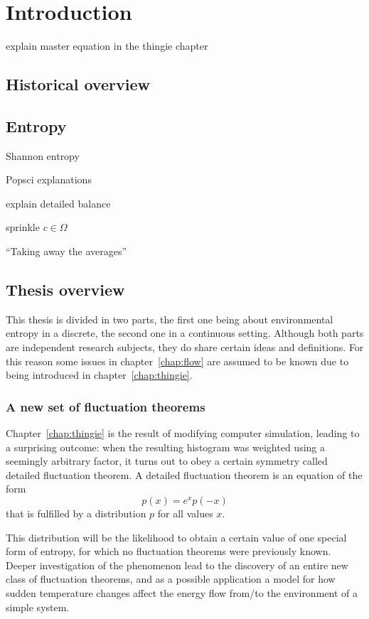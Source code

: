 \chapter{Introduction}

explain master equation in the thingie chapter


\section{Historical overview}

\section{Entropy}

Shannon entropy

Popsci explanations

explain detailed balance

sprinkle \(c\in\Omega\)


``Taking away the averages''


\section{Thesis overview}

This thesis is divided in two parts, the first one being about environmental entropy in a discrete, the second one in a continuous setting. Although both parts are independent research subjects, they do share certain ideas and definitions. For this reason some issues in chapter~\ref{chap:flow} are assumed to be known due to being introduced in chapter~\ref{chap:thingie}.


\subsection{A new set of fluctuation theorems}

Chapter~\ref{chap:thingie} is the result of modifying computer simulation, leading to a surprising outcome: when the resulting histogram was weighted using a seemingly arbitrary factor, it turns out to obey a certain symmetry called detailed fluctuation theorem. A detailed fluctuation theorem is an equation of the form
%
\begin{equation}
	p(x) = e^{x}p(-x)
\end{equation}
%
that is fulfilled by a distribution \(p\) for all values \(x\).

This distribution will be the likelihood to obtain a certain value of one special form of entropy, for which no fluctuation theorems were previously known. Deeper investigation of the phenomenon lead to the discovery of an entire new class of fluctuation theorems, and as a possible application a model for how sudden temperature changes affect the energy flow from/to the environment of a simple system.





